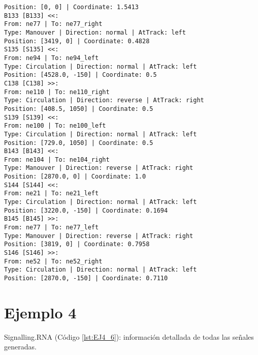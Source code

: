 \begin{lstlisting}[language = {}, tabsize=4, basicstyle=\footnotesize\ttfamily, showspaces=false, showstringspaces=false, caption = Signalling.RNA, label = {lst:EJ3_6}]
Position: [0, 0] | Coordinate: 1.5413
B133 [B133] <<:
From: ne77 | To: ne77_right
Type: Manouver | Direction: normal | AtTrack: left 
Position: [3419, 0] | Coordinate: 0.4828
S135 [S135] <<:
From: ne94 | To: ne94_left
Type: Circulation | Direction: normal | AtTrack: left 
Position: [4528.0, -150] | Coordinate: 0.5
C138 [C138] >>:
From: ne110 | To: ne110_right
Type: Circulation | Direction: reverse | AtTrack: right 
Position: [408.5, 1050] | Coordinate: 0.5
S139 [S139] <<:
From: ne100 | To: ne100_left
Type: Circulation | Direction: normal | AtTrack: left 
Position: [729.0, 1050] | Coordinate: 0.5
B143 [B143] <<:
From: ne104 | To: ne104_right
Type: Manouver | Direction: reverse | AtTrack: right 
Position: [2870.0, 0] | Coordinate: 1.0
S144 [S144] <<:
From: ne21 | To: ne21_left
Type: Circulation | Direction: normal | AtTrack: left 
Position: [3220.0, -150] | Coordinate: 0.1694
B145 [B145] >>:
From: ne77 | To: ne77_left
Type: Manouver | Direction: reverse | AtTrack: right 
Position: [3819, 0] | Coordinate: 0.7958
S146 [S146] >>:
From: ne52 | To: ne52_right
Type: Circulation | Direction: normal | AtTrack: left 
Position: [2870.0, -150] | Coordinate: 0.7110
	\end{lstlisting}	
	\section{Ejemplo 4}
	Signalling.RNA (Código \ref{lst:EJ4_6}): información detallada de todas las señales generadas.
	
